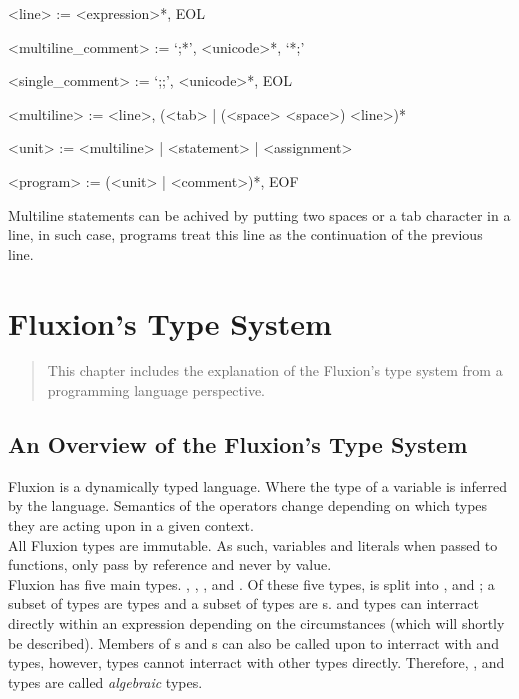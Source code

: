 \documentclass[11pt,a4paper]{book}
\begin{document}
\begin{grammar}
<line> := <expression>*, EOL

<multiline\_comment> := `;*', <unicode>*, `*;'

<single\_comment> := `;;', <unicode>*, EOL

<multiline> := <line>, (<tab> | (<space> <space>) <line>)*

<unit> := <multiline> | <statement> | <assignment>

<program> := (<unit> | <comment>)*, EOF

\end{grammar}

Multiline statements can be achived by putting two spaces or a tab character in a line, in such case, programs treat this line as the continuation of the previous line.

\chapter{Fluxion's Type System}

\vspace{1em}
\begin{quotation}
This chapter includes the explanation of the Fluxion's type system from a programming language perspective.
\end{quotation}
\newpage


\section{An Overview of the Fluxion's Type System}

Fluxion is a dynamically typed language. Where the type of a variable is inferred by the language. Semantics of the operators change depending on which types they are acting upon in a given context. \\

All Fluxion types are immutable. As such, variables and literals when passed to functions, only pass by reference and never by value.\\

Fluxion has five main types. , , ,  and . Of these five types,  is split into ,  and ; a subset of  types are  types and a subset of  types are s.   and  types can interract directly within an expression depending on the circumstances (which will shortly be described). Members of s and s can also be called upon to interract with  and  types, however,  types cannot interract with other types directly. Therefore, ,  and  types are called \textit{algebraic} types.
\end{document}
